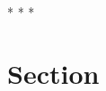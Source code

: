 \documentclass[11pt]{article}
\title{}
\author{Jonathan Yong}
\date{\today}
\begin{document}
\maketitle
\tableofcontents

\begin{center}
    \vspace{0.5cm}
    * * *
\end{center}

\section{Section}


\end{document}
